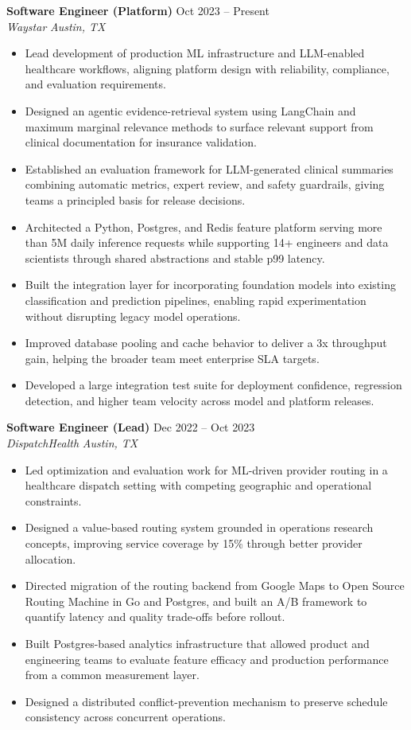 \documentclass[10pt,letterpaper]{article}
\newcommand{\roleheading}[4]{%
  \textbf{#1} \hfill #2\\
  \textit{#3} \hfill \textit{#4}\par
  \vspace{0.15em}
}
\begin{document}
\roleheading{Software Engineer (Platform)}{Oct 2023 -- Present}{Waystar}{Austin, TX}
\begin{itemize}
  \item Lead development of production ML infrastructure and LLM-enabled healthcare workflows, aligning platform design with reliability, compliance, and evaluation requirements.
  \item Designed an agentic evidence-retrieval system using LangChain and maximum marginal relevance methods to surface relevant support from clinical documentation for insurance validation.
  \item Established an evaluation framework for LLM-generated clinical summaries combining automatic metrics, expert review, and safety guardrails, giving teams a principled basis for release decisions.
  \item Architected a Python, Postgres, and Redis feature platform serving more than 5M daily inference requests while supporting 14+ engineers and data scientists through shared abstractions and stable p99 latency.
  \item Built the integration layer for incorporating foundation models into existing classification and prediction pipelines, enabling rapid experimentation without disrupting legacy model operations.
  \item Improved database pooling and cache behavior to deliver a 3x throughput gain, helping the broader team meet enterprise SLA targets.
  \item Developed a large integration test suite for deployment confidence, regression detection, and higher team velocity across model and platform releases.
\end{itemize}

\roleheading{Software Engineer (Lead)}{Dec 2022 -- Oct 2023}{DispatchHealth}{Austin, TX}
\begin{itemize}
  \item Led optimization and evaluation work for ML-driven provider routing in a healthcare dispatch setting with competing geographic and operational constraints.
  \item Designed a value-based routing system grounded in operations research concepts, improving service coverage by 15\% through better provider allocation.
  \item Directed migration of the routing backend from Google Maps to Open Source Routing Machine in Go and Postgres, and built an A/B framework to quantify latency and quality trade-offs before rollout.
  \item Built Postgres-based analytics infrastructure that allowed product and engineering teams to evaluate feature efficacy and production performance from a common measurement layer.
  \item Designed a distributed conflict-prevention mechanism to preserve schedule consistency across concurrent operations.
\end{itemize}
\end{document}

